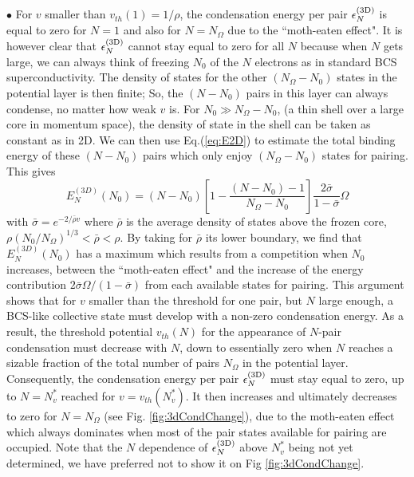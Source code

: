 \documentclass[5p,twocolumn]{elsarticle}
\begin{document}
$\bullet$ For $v$ smaller than $v_{th}(1)=1/\rho$, the condensation energy per pair $\epsilon_N^{{\text{(3D)}}}$ is equal to zero for $N=1$ and also for $N=N_\Omega$ due to the ``moth-eaten effect".  It is however clear that $\epsilon_N^{{\text{(3D)}}}$ cannot stay equal to zero for all $N$ because when $N$ gets large, we can always think of freezing $N_0$ of the $N$ electrons as in standard BCS superconductivity. The density of states for the other $(N_\Omega - N_0)$ states in the potential layer is then finite; So, the $(N-N_0)$ pairs in this layer can always condense, no matter how weak $v$ is. For $N_{0}\gg{}N_{\Omega}-N_{0}$, (a thin shell over a large core in momentum space), the density of state in the shell can be taken as constant as in 2D. We can then use Eq.(\ref{eq:E2D}) to estimate the total binding energy of these $(N-N_0)$ pairs which only enjoy $(N_\Omega - N_0)$ states for pairing. This gives
\begin{equation}\label{eq:E3D}
{{E}}_N^{(3D)}(N_0)=(N-N_0)\left[1-\frac{(N-N_0)-1}{N_\Omega-N_0}\right]\frac{2\bar\sigma}{1-\bar\sigma}\Omega
\end{equation}
with $\bar{\sigma}=e^{-2/{\bar{\rho}v}}$ where $\bar\rho$ is the average density of states above the frozen core, $\rho(N_0/N_\Omega)^{ 1/3}<\bar\rho<\rho$. By taking for  $\bar\rho$ its lower boundary, we find that ${{E}}_N^{(3D)}(N_0)$ has a maximum which results from a competition when $N_0$ increases, between the ``moth-eaten effect" and the increase of the energy contribution $2\bar\sigma\Omega/(1-\bar\sigma)$  from each available states for pairing.
This argument shows that for $v$ smaller than the threshold for one pair, but $N$ large enough, a BCS-like collective state must develop with a non-zero condensation energy. 
As a result, the threshold potential  $v_{th}(N)$ for the appearance of $N$-pair condensation  must decrease with $N$, down to essentially zero when $N$ reaches a sizable fraction of the total number of pairs $N_\Omega$ in the potential layer.  Consequently, the condensation energy per pair $\epsilon^{{{\text{(3D)}}}}_{N}$ must stay equal to zero, up to $N=N_v^*$ reached for $v=v_{th}(N_v^*)$. It then increases and ultimately decreases to zero for $N=N_\Omega$ (see Fig. \ref{fig:3dCondChange}), due to the moth-eaten effect which always dominates when most of the pair states available for pairing are occupied.  Note that the $N$ dependence of $\epsilon_{N}^{{{\text{(3D)}}}}$ above $N_{v}^{*}$ being not yet determined, we have preferred not to show it on Fig \ref{fig:3dCondChange}. 
\end{document}
